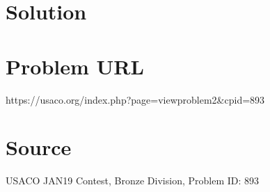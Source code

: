 \documentclass[12pt]{article}
\begin{document}
\section*{Solution}


\section*{Problem URL}
https://usaco.org/index.php?page=viewproblem2&cpid=893

\section*{Source}
USACO JAN19 Contest, Bronze Division, Problem ID: 893
\end{document}
